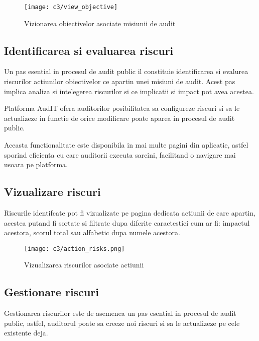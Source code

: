\vspace{1cm}
\begin{figure}[h]
	\centering
	
	\texttt{[image: c3/view\_objective]}
	\caption{Vizionarea obiectivelor asociate misiunii de audit}
\end{figure}



\subsection*{Identificarea si evaluarea riscuri}

Un pas esential in procesul de audit public il constituie identificarea si evalurea riscurilor actiunilor obiectivelor ce apartin unei misiuni de audit. Acest pas implica analiza si intelegerea riscurilor si ce implicatii si impact pot avea acestea.

 Platforma AudIT ofera auditorilor posibilitatea sa configureze riscuri si sa le actualizeze in functie de orice modificare poate aparea in procesul de audit public.
 
 Aceasta functionalitate este disponibila in mai multe pagini din aplicatie, astfel sporind eficienta cu care auditorii executa sarcini, facilitand o navigare mai usoara pe platforma.
 
 \subsection*{Vizualizare riscuri}
 Riscurile identifcate pot fi vizualizate pe pagina dedicata actiunii de care apartin, acestea putand fi sortate si filtrate dupa diferite caractestici cum ar fi: impactul acestora, scorul total sau alfabetic dupa numele acestora.
 
 \vspace{1cm}
 \begin{figure}[h]
 	\centering
 	
 	\texttt{[image: c3/action\_risks.png]}
 	\caption{Vizualizarea riscurilor asociate actiunii}
 \end{figure}
 
 \subsection*{Gestionare riscuri}
Gestionarea riscurilor este de asemenea un pas esential in procesul de audit public, astfel, auditorul poate sa creeze noi riscuri si sa le actualizeze pe cele existente deja.

